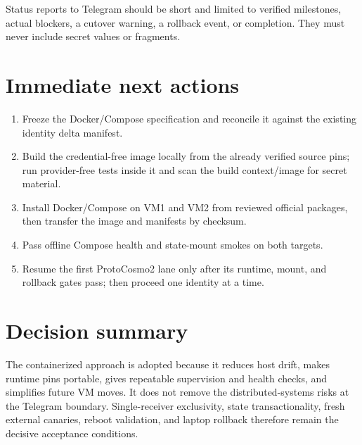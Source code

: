\documentclass[11pt]{article}
\begin{document}
Status reports to Telegram should be short and limited to verified milestones,
actual blockers, a cutover warning, a rollback event, or completion. They must
never include secret values or fragments.

\section{Immediate next actions}

\begin{enumerate}
\item Freeze the Docker/Compose specification and reconcile it against the
existing identity delta manifest.
\item Build the credential-free image locally from the already verified source
pins; run provider-free tests inside it and scan the build context/image for
secret material.
\item Install Docker/Compose on VM1 and VM2 from reviewed official packages,
then transfer the image and manifests by checksum.
\item Pass offline Compose health and state-mount smokes on both targets.
\item Resume the first ProtoCosmo2 lane only after its runtime, mount, and
rollback gates pass; then proceed one identity at a time.
\end{enumerate}

\section{Decision summary}

The containerized approach is adopted because it reduces host drift, makes
runtime pins portable, gives repeatable supervision and health checks, and
simplifies future VM moves. It does not remove the distributed-systems risks
at the Telegram boundary. Single-receiver exclusivity, state transactionality,
fresh external canaries, reboot validation, and laptop rollback therefore
remain the decisive acceptance conditions.
\end{document}
